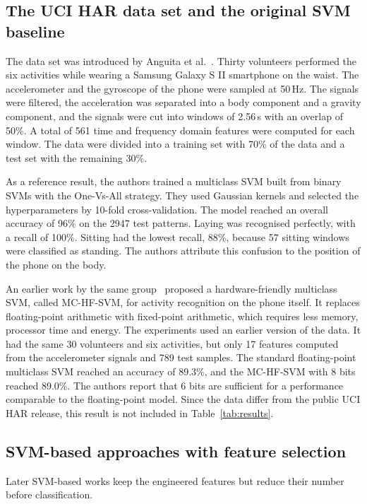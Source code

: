 \documentclass[a4paper, 11pt]{article}
\begin{document}
\subsection{The UCI HAR data set and the original SVM baseline}

The data set was introduced by Anguita et al.~\cite{anguita2013}. Thirty volunteers performed the six activities while wearing a Samsung Galaxy S II smartphone on the waist. The accelerometer and the gyroscope of the phone were sampled at 50\,Hz. The signals were filtered, the acceleration was separated into a body component and a gravity component, and the signals were cut into windows of 2.56\,s with an overlap of 50\%. A total of 561 time and frequency domain features were computed for each window. The data were divided into a training set with 70\% of the data and a test set with the remaining 30\%.

As a reference result, the authors trained a multiclass SVM built from binary SVMs with the One-Vs-All strategy. They used Gaussian kernels and selected the hyperparameters by 10-fold cross-validation. The model reached an overall accuracy of 96\% on the 2947 test patterns. Laying was recognised perfectly, with a recall of 100\%. Sitting had the lowest recall, 88\%, because 57 sitting windows were classified as standing. The authors attribute this confusion to the position of the phone on the body.

An earlier work by the same group~\cite{anguita2012} proposed a hardware-friendly multiclass SVM, called MC-HF-SVM, for activity recognition on the phone itself. It replaces floating-point arithmetic with fixed-point arithmetic, which requires less memory, processor time and energy. The experiments used an earlier version of the data. It had the same 30 volunteers and six activities, but only 17 features computed from the accelerometer signals and 789 test samples. The standard floating-point multiclass SVM reached an accuracy of 89.3\%, and the MC-HF-SVM with 8 bits reached 89.0\%. The authors report that 6 bits are sufficient for a performance comparable to the floating-point model. Since the data differ from the public UCI HAR release, this result is not included in Table~\ref{tab:results}.

\subsection{SVM-based approaches with feature selection}

Later SVM-based works keep the engineered features but reduce their number before classification.
\end{document}
